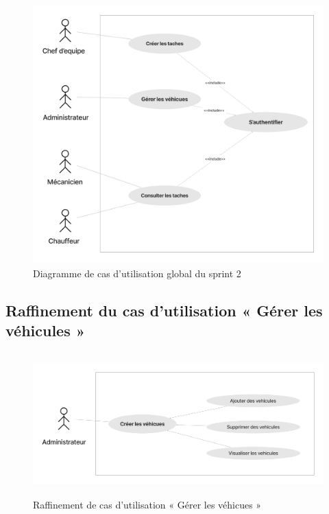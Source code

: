 \begin{figure}[h!]
  \centering
  \includegraphics[width=1\textwidth,height=10cm]{chap4.images/dcu global sprint 2.png}
  \caption{Diagramme de cas d’utilisation global du sprint 2}

\end{figure}


\subsection{Raffinement du cas d'utilisation « Gérer les véhicules »}

\begin{figure}[h!]
  \centering
  \includegraphics[width=1\textwidth,height=5.5cm]{chap4.images/raf Gérer les véhicules.png}
  \caption{Raffinement de cas d’utilisation « Gérer les véhicues »}

\end{figure}


